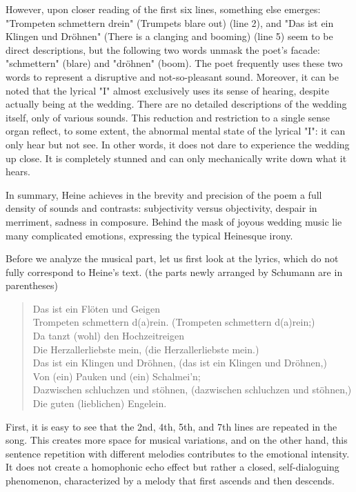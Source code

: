 \documentclass[10pt,a4paper,twocolumn]{rho}
\begin{document}
However, upon closer reading of the first six lines, something else emerges: "Trompeten schmettern drein" (Trumpets blare out) (line 2), and "Das ist ein Klingen und Dröhnen" (There is a clanging and booming) (line 5) seem to be direct descriptions, but the following two words unmask the poet's facade: "schmettern" (blare) and "dröhnen" (boom). The poet frequently uses these two words to represent a disruptive and not-so-pleasant sound. Moreover, it can be noted that the lyrical "I" almost exclusively uses its sense of hearing, despite actually being at the wedding. There are no detailed descriptions of the wedding itself, only of various sounds. This reduction and restriction to a single sense organ reflect, to some extent, the abnormal mental state of the lyrical "I": it can only hear but not see. In other words, it does not dare to experience the wedding up close. It is completely stunned and can only mechanically write down what it hears.

In summary, Heine achieves in the brevity and precision of the poem a full density of sounds and contrasts: subjectivity versus objectivity, despair in merriment, sadness in composure. Behind the mask of joyous wedding music lie many complicated emotions, expressing the typical Heinesque irony.

Before we analyze the musical part, let us first look at the lyrics, which do not fully correspond to Heine's text. (the parts newly arranged by Schumann are in parentheses)

\begin{quote}
Das ist ein Flöten und Geigen\\
Trompeten schmettern d(a)rein. (Trompeten schmettern d(a)rein;)\\
Da tanzt (wohl) den Hochzeitreigen\\
Die Herzallerliebste mein, (die Herzallerliebste mein.)\\
Das ist ein Klingen und Dröhnen, (das ist ein Klingen und Dröhnen,)\\
Von (ein) Pauken und (ein) Schalmei’n;\\
Dazwischen schluchzen und stöhnen, (dazwischen schluchzen und stöhnen,)\\
Die guten (lieblichen) Engelein.\\
\end{quote}

First, it is easy to see that the 2nd, 4th, 5th, and 7th lines are repeated in the song. This creates more space for musical variations, and on the other hand, this sentence repetition with different melodies contributes to the emotional intensity. It does not create a homophonic echo effect but rather a closed, self-dialoguing phenomenon, characterized by a melody that first ascends and then descends.
\end{document}
